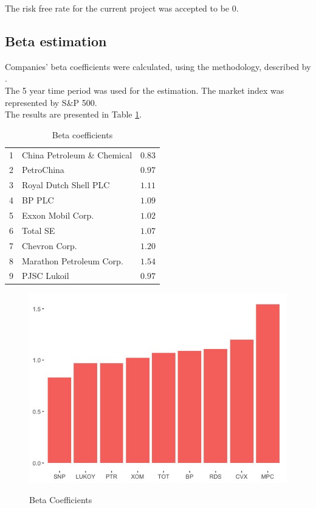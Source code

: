 \documentclass [a4paper, 11pt] {article}
\begin{document}
The risk free rate for the current project was accepted to be 0.

\clearpage

\subsection {Beta estimation}

Companies' beta coefficients were calculated, using the methodology, described by \cite{Casey}.\\
The 5 year time period was used for the estimation. The market index was represented by S\&P 500.\\
The results are presented in Table \ref{tab:beta}.\\

\begin{table}[!h]
\caption{Beta coefficients\label{beta}} 
\begin{center}
\begin{tabular}{llr}
\hline\hline
1&China Petroleum \& Chemical&$0.83$\tabularnewline
2&PetroChina&$0.97$\tabularnewline
3&Royal Dutch Shell PLC&$1.11$\tabularnewline
4&BP PLC&$1.09$\tabularnewline
5&Exxon Mobil Corp.&$1.02$\tabularnewline
6&Total SE&$1.07$\tabularnewline
7&Chevron Corp.&$1.20$\tabularnewline
8&Marathon Petroleum Corp.&$1.54$\tabularnewline
9&PJSC Lukoil&$0.97$\tabularnewline
\hline
\end{tabular}\end{center}
\label{tab:beta}
\end{table}

\begin{figure}[!h]
\caption{Beta Coefficients}
\includegraphics[scale=0.65]{beta_plot_bars}
\label{fig:beta}
\end{figure}
\end{document}
